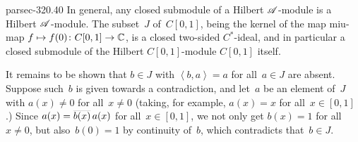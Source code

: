 \documentclass[b5page]{book}
\begin{document}
\begin{solution}{parsec-320.40}%
In general,
any closed submodule of a Hilbert $\mathscr{A}$-module
is a Hilbert $\mathscr{A}$-module.
The subset~$J$ of~$C[0,1]$,
being the kernel of the map miu-map $f\mapsto f(0)\colon C[0,1]\to\mathbb{C}$,
is a closed two-sided $C^*$-ideal,
and in particular a closed submodule of
the Hilbert $C[0,1]$-module $C[0,1]$ itself.

It remains to be shown that $b\in J$ 
with $\left<b,a\right>=a$ for all~$a\in J$ are absent.
Suppose such~$b$ is given towards a contradiction,
and let~$a$ be an element of~$J$
with $a(x)\neq 0$ for all~$x\neq 0$
(taking, for example, $a(x)=x$ for all~$x\in [0,1]$.)
Since $a(x)= \smash{\overline{b(x)}}\,a(x)$
for all~$x\in [0,1]$,
we not only get $b(x)=1$
for all~$x\neq 0$,
but also~$b(0)=1$ by continuity of~$b$,
which contradicts that~$b\in J$.
\end{solution}
\end{document}
